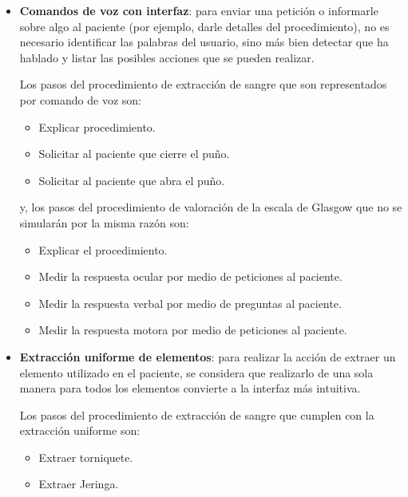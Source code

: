 \begin{itemize}
\item 
    \textbf{Comandos de voz con interfaz}:  para enviar una petición o informarle 
    sobre algo al paciente (por ejemplo, darle detalles del procedimiento), 
    no es necesario identificar las palabras del usuario, sino más bien detectar
    que ha hablado y listar las posibles acciones que se pueden realizar.
    
    Los pasos del procedimiento de extracción de sangre que son representados por 
    comando de voz son:
    
    \begin{itemize}
        \item Explicar procedimiento.
        \item Solicitar al paciente que cierre el puño.
        \item Solicitar al paciente que abra el puño.
    \end{itemize}
    
    y, los pasos del procedimiento de valoración de la escala de Glasgow 
    que no se simularán por la misma razón son:
    \begin{itemize}
        \item Explicar el procedimiento.
        \item Medir la respuesta ocular por medio de peticiones al paciente.
        \item Medir la respuesta verbal por medio de preguntas al paciente.
        \item Medir la respuesta motora por medio de peticiones al paciente.
    \end{itemize}

\item
    \textbf{Extracción uniforme de elementos}: para realizar la acción de extraer 
    un elemento utilizado en el paciente, se considera que realizarlo de una sola 
    manera para todos los elementos convierte a la interfaz más intuitiva.

    
    Los pasos del procedimiento de extracción de sangre que cumplen con la extracción 
    uniforme son:
    
    \begin{itemize}
        \item Extraer torniquete.
        \item Extraer Jeringa.
    \end{itemize}
    

\end{itemize}
